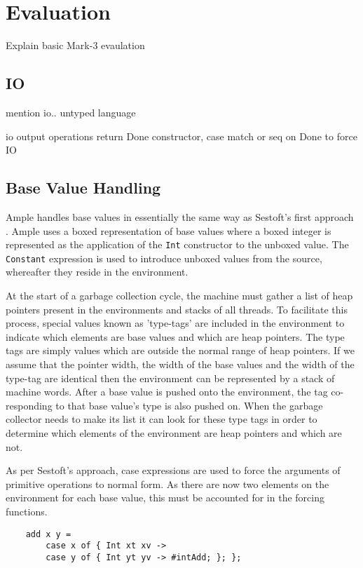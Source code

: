 \documentclass{llncs}
\begin{document}
\section{Evaluation}

Explain basic Mark-3 evaulation

\subsection{IO}
mention io.. untyped language

io output operations return Done constructor, case match or seq on Done to force IO



\subsection{Base Value Handling}
Ample handles base values in essentially the same way as Sestoft's first approach \cite{sestoft}. Ample uses a boxed representation of base values where a boxed integer is represented as the application of the \texttt{Int} constructor to the unboxed value. The \texttt{Constant} expression is used to introduce unboxed values from the source, whereafter they reside in the environment.

At the start of a garbage collection cycle, the machine must gather a list of heap pointers present in the environments and stacks of all threads. To facilitate this process, special values known as 'type-tags' are included in the environment to indicate which elements are base values and which are heap pointers. The type tags are simply values which are outside the normal range of heap pointers. If we assume that the pointer width, the width of the base values and the width of the type-tag are identical then the environment can be represented by a stack of machine words. After a base value is pushed onto the environment, the tag co-responding to that base value's type is also pushed on. When the garbage collector needs to make its list it can look for these type tags in order to determine which elements of the environment are heap pointers and which are not.

As per Sestoft's approach, case expressions are used to force the arguments of primitive operations to normal form. As there are now two elements on the environment for each base value, this must be accounted for in the forcing functions.


\begin{verbatim}
    add x y = 
        case x of { Int xt xv -> 
        case y of { Int yt yv -> #intAdd; }; };
\end{verbatim}
\end{document}
